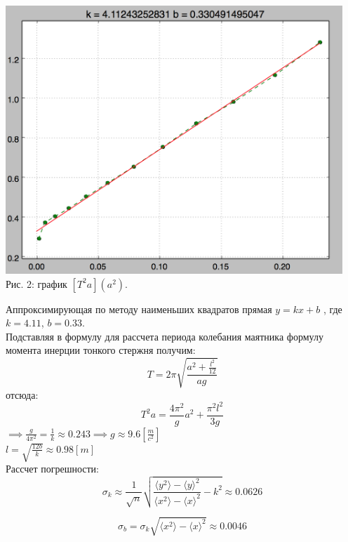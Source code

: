 \documentclass[12pt]{article}
\begin{document}
\begin{enumerate}
        \begin{center} 
            \includegraphics[width=5in]{figure.png} \\ Рис. 2: график $[T^2 a ] (a^2)$.
        \end{center}
        Аппроксимирующая по методу наименьших квадратов прямая $y = kx + b$ , где $k = 4.11$, $b = 0.33$.
        \\
        Подставляя в формулу для рассчета периода колебания маятника формулу момента инерции тонкого стержня получим:
        \begin{equation}
              T = 2 \pi \sqrt{\frac{a^2 + \frac{l^2}{12}}{ag}}     
        \end{equation}
        отсюда: 
        \begin{equation}
              T^2a = \frac{4 \pi^2 } {g} a^2 + \frac{\pi^2 l^2}{3 g}
        \end{equation}
        $\implies \frac{g}{4\pi^2} = \frac{1}{k} \approx 0.243 \implies g \approx 9.6 [\frac{m}{c^2}]$ \\
        $l = \sqrt{\frac{12b}{k}} \approx 0.98[m]$ \\
        Рассчет погрешности: 
        \begin{equation}
            \sigma_{k} \approx \frac{1}{\sqrt{n}}
                \sqrt{\frac{\langle y^2 \rangle -  \langle y \rangle ^2}
                        {\langle x^2 \rangle - \langle x \rangle ^2} 
                    - k^2}  \approx 0.0626
        \end{equation}

        \begin{equation}
            \sigma_{b} = \sigma_{k} \sqrt{\langle x^2 \rangle - \langle x \rangle ^2} \approx 0.0046
        \end{equation}
        

\end{enumerate}
\end{document}
